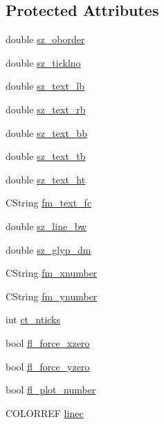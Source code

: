 \subsection*{Protected Attributes}
\begin{DoxyCompactItemize}
\item 
double \hyperlink{classCRPGraphHelper_a57f4ee214ac65811bf90afd7a33b107e}{sz\_\-oborder}
\item 
double \hyperlink{classCRPGraphHelper_a09fa0c95de472131ceccdba40f2016b9}{sz\_\-ticklno}
\item 
double \hyperlink{classCRPGraphHelper_a386cc736b4c41cd540f6b9b6cbb08219}{sz\_\-text\_\-lb}
\item 
double \hyperlink{classCRPGraphHelper_a83b10dae2fec49817c1b56d6dfe4cff8}{sz\_\-text\_\-rb}
\item 
double \hyperlink{classCRPGraphHelper_a0921db7d69b84063023018322cc18ad9}{sz\_\-text\_\-bb}
\item 
double \hyperlink{classCRPGraphHelper_a6dbcd593bf7e08bd3d0c2f1e7b2bf213}{sz\_\-text\_\-tb}
\item 
double \hyperlink{classCRPGraphHelper_ae1e7453e496103f04e54e8a16783a126}{sz\_\-text\_\-ht}
\item 
CString \hyperlink{classCRPGraphHelper_a8ea15cf9c9d8ed6f888d59304a38ef5b}{fm\_\-text\_\-fc}
\item 
double \hyperlink{classCRPGraphHelper_aab1b86d0aeec4ec40423705287d29b5b}{sz\_\-line\_\-bw}
\item 
double \hyperlink{classCRPGraphHelper_aae93e3cb88f408976e02f3eef688bd40}{sz\_\-glyp\_\-dm}
\item 
CString \hyperlink{classCRPGraphHelper_a2b7edb531c50badf319bee7972fa07fd}{fm\_\-xnumber}
\item 
CString \hyperlink{classCRPGraphHelper_ac5aa8f1b1be504529461543acfb9f398}{fm\_\-ynumber}
\item 
int \hyperlink{classCRPGraphHelper_a07e0fef03b037dd04265e6bfbc8fcab4}{ct\_\-nticks}
\item 
bool \hyperlink{classCRPGraphHelper_a47f9063dfd994fa853b2df5869b9b372}{fl\_\-force\_\-xzero}
\item 
bool \hyperlink{classCRPGraphHelper_afd93918ab5f5c25c3766275f3dcbe8e0}{fl\_\-force\_\-yzero}
\item 
bool \hyperlink{classCRPGraphHelper_aef025207a9708d5314919525e182b6b8}{fl\_\-plot\_\-number}
\item 
COLORREF \hyperlink{classCRPGraphHelper_a738f3af19a9cdb5ddc979a2d7652388e}{linec}
\item 

\end{DoxyCompactItemize}
